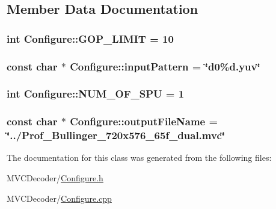 \subsection{Member Data Documentation}
\hypertarget{class_configure_a0a595a8bf2825d2238fa77b2ecff2c5a}{
\subsubsection[{GOP\_\-LIMIT}]{\setlength{\rightskip}{0pt plus 5cm}int {\bf Configure::GOP\_\-LIMIT} = 10}}
\label{class_configure_a0a595a8bf2825d2238fa77b2ecff2c5a}
\hypertarget{class_configure_aa6d6606a0e2fb33b2f828f207df7e140}{
\subsubsection[{inputPattern}]{\setlength{\rightskip}{0pt plus 5cm}const char $\ast$ {\bf Configure::inputPattern} = \char`\"{}d0\%d.yuv\char`\"{}}}
\label{class_configure_aa6d6606a0e2fb33b2f828f207df7e140}
\hypertarget{class_configure_ac48067b7f9d47427e932b4c44f4c9248}{
\subsubsection[{NUM\_\-OF\_\-SPU}]{\setlength{\rightskip}{0pt plus 5cm}int {\bf Configure::NUM\_\-OF\_\-SPU} = 1}}
\label{class_configure_ac48067b7f9d47427e932b4c44f4c9248}
\hypertarget{class_configure_a0e7dd4e79c40df653c7ca73ecbab5d39}{
\subsubsection[{outputFileName}]{\setlength{\rightskip}{0pt plus 5cm}const char $\ast$ {\bf Configure::outputFileName} = \char`\"{}../Prof\_\-Bullinger\_\-720x576\_\-65f\_\-dual.mvc\char`\"{}}}
\label{class_configure_a0e7dd4e79c40df653c7ca73ecbab5d39}


The documentation for this class was generated from the following files:\begin{DoxyCompactItemize}
\item 
MVCDecoder/\hyperlink{_configure_8h}{Configure.h}\item 
MVCDecoder/\hyperlink{_configure_8cpp}{Configure.cpp}\end{DoxyCompactItemize}
